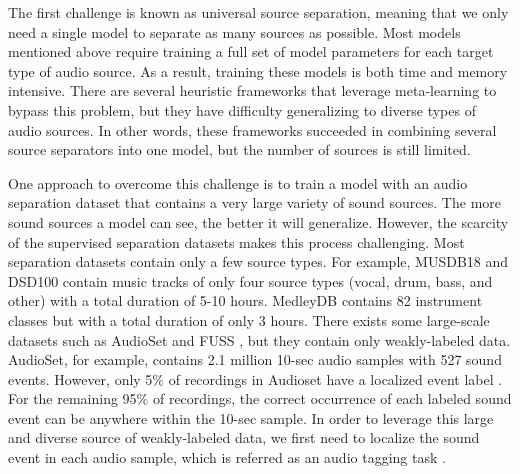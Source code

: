 \documentclass[letterpaper]{article} \usepackage{aaai22}  \usepackage{times}  \usepackage{helvet}  \usepackage{courier}  \usepackage[hyphens]{url}  \usepackage{graphicx} \urlstyle{rm} \def\UrlFont{\rm}  \usepackage{natbib}  \usepackage{caption} \DeclareCaptionStyle{ruled}{labelfont=normalfont,labelsep=colon,strut=off} \frenchspacing  \setlength{\pdfpagewidth}{8.5in}  \setlength{\pdfpageheight}{11in}  \usepackage{algorithm}
\begin{document}
The first challenge is known as universal source separation, meaning that we only need a single model to separate as many sources as possible. Most models mentioned above require training a full set of model parameters for each target type of audio source. As a result, training these models is both time and memory intensive. There are several heuristic frameworks \cite{metatasnet} that leverage meta-learning to bypass this problem, but they have difficulty generalizing to diverse types of audio sources. In other words, these frameworks succeeded in combining several source separators into one model, but the number of sources is still limited.

One approach to overcome this challenge is to train a model with an audio separation dataset that contains a very large variety of sound sources. The more sound sources a model can see, the better it will generalize. However, the scarcity of the supervised separation datasets makes this process challenging. Most separation datasets contain only a few source types. For example, MUSDB18 \cite{musdb18} and DSD100 \cite{dsd100} contain music tracks of only four source types (vocal, drum, bass, and other) 
with a total duration of 5-10 hours. MedleyDB \cite{medleydb} contains 82 instrument classes but with a total duration of only 3 hours. There exists some large-scale datasets such as AudioSet \cite{audioset} and FUSS \cite{fuss}, but they contain only weakly-labeled data. AudioSet, for example, contains 2.1 million 10-sec audio samples with 527 sound events. However, only 5\% of recordings in Audioset have a localized event label \cite{audioset-strong}. For the remaining 95\% of recordings, the correct occurrence of each labeled sound event can be anywhere within the 10-sec sample. In order to leverage this large and diverse source of weakly-labeled data, we first need to localize the sound event in each audio sample, which is referred as an audio tagging task \cite{at-dcase}.
\end{document}
